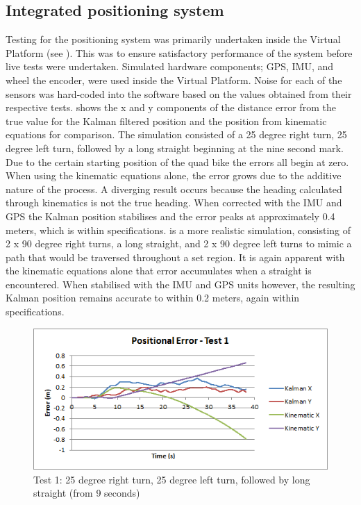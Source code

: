 \documentclass[main.tex]{subfiles}
\begin{document}
\subsection{Integrated positioning system}
Testing for the positioning system was primarily undertaken inside the Virtual Platform (see ). This was to ensure satisfactory performance of the system before live tests were undertaken. Simulated hardware components; GPS, IMU, and wheel the encoder, were used inside the Virtual Platform. Noise for each of the sensors was hard-coded into the software based on the values obtained from their respective tests.
 shows the x and y components of the distance error from the true value for the Kalman filtered position and the position from kinematic equations for comparison. The simulation consisted of a 25 degree right turn, 25 degree left turn, followed by a long straight beginning at the nine second mark. Due to the certain starting position of the quad bike the errors all begin at zero. When using the kinematic equations alone, the error grows due to the additive nature of the process. A diverging result occurs because the heading calculated through kinematics is not the true heading. When corrected with the IMU and GPS the Kalman position stabilises and the error peaks at approximately 0.4 meters, which is within specifications.  is a more realistic simulation, consisting of 2 x 90 degree right turns, a long straight, and 2 x 90 degree left turns to mimic a path that would be traversed throughout a set region. It is again apparent with the kinematic equations alone that error accumulates when a straight is encountered. When stabilised with the IMU and GPS units however, the resulting Kalman position remains accurate to within 0.2 meters, again within specifications.
\begin{figure}[ht]
\includegraphics[width=\textwidth]{5-Testing/position_error_test_1.png}
\centering
\caption[Positioning system test 1]{Test 1: 25 degree right turn, 25 degree left turn, followed by long straight (from 9 seconds)}
\end{figure}
\end{document}
